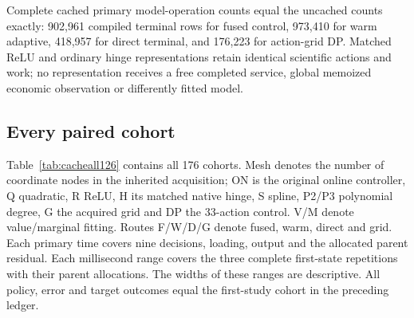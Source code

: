 Complete cached primary model-operation counts equal the uncached counts exactly: 902,961 compiled terminal rows for fused control, 973,410 for warm adaptive, 418,957 for direct terminal, and 176,223 for action-grid DP. Matched ReLU and ordinary hinge representations retain identical scientific actions and work; no representation receives a free completed service, global memoized economic observation or differently fitted model.

\subsection{Every paired cohort}
Table~\ref{tab:cacheall126} contains all 176 cohorts. Mesh denotes the number of coordinate nodes in the inherited acquisition; ON is the original online controller, Q quadratic, R ReLU, H its matched native hinge, S spline, P2/P3 polynomial degree, G the acquired grid and DP the 33-action control. V/M denote value/marginal fitting. Routes F/W/D/G denote fused, warm, direct and grid. Each primary time covers nine decisions, loading, output and the allocated parent residual. Each millisecond range covers the three complete first-state repetitions with their parent allocations. The widths of these ranges are descriptive. All policy, error and target outcomes equal the first-study cohort in the preceding ledger.


